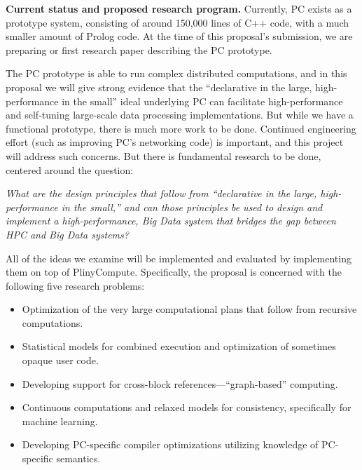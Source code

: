 \vspace{5 pt}
\noindent
\textbf{Current status and proposed research program.}
Currently, PC exists as a prototype system, consisting of around
150,000 lines of C++ code, with a much smaller amount of Prolog code.
At the time of this proposal's submission, we are preparing or first
research paper describing the PC prototype.

The PC prototype
is able to run complex distributed computations, and in this proposal we will
give strong evidence that the ``declarative in the large, high-performance in the small''
ideal underlying PC can facilitate high-performance and self-tuning large-scale data processing implementations.
But while we have a functional prototype, there is much more work to be done.
Continued engineering effort (such as improving PC's networking code) is important,
and this project will address such concerns.
But there is fundamental research to be done, 
centered around the question:

\vspace{5pt}
\noindent
\emph{What are the design principles that follow from ``declarative
in the large, high-performance in the small,'' and can those principles be used
to design and implement
a high-performance, Big Data system that bridges the gap between HPC and Big Data systems?}

\vspace{5pt}
\noindent
All of the ideas we examine will be implemented and evaluated by implementing them on top of
PlinyCompute.
Specifically, the proposal is concerned with the following five research problems:

\vspace{-7 pt}
\begin{itemize}
\item Optimization of the very large computational plans that follow from recursive computations.

\vspace{-7 pt}

\item Statistical models for combined execution and optimization of sometimes opaque user code.

\vspace{-7 pt}

\item Developing support for cross-block references---``graph-based'' computing.

\vspace{-7 pt}

\item Continuous computations and relaxed models for consistency, specifically for machine learning.

\vspace{-7 pt}

\item Developing PC-specific compiler optimizations utilizing knowledge of PC-specific semantics.
\end{itemize}

